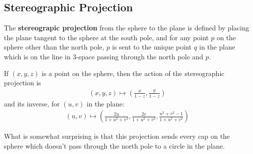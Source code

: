 \subsection{Stereographic Projection}


\begin{definition}
  The \textbf{stereograpic projection} from the sphere to the plane is
  defined by placing the plane tangent to the sphere at the south
  pole, and for any point $p$ on the sphere other than the north pole,
  $p$ is sent to the unique point $q$ in the plane which is on the
  line in 3-space passing through the north pole and $p$.

  If $(x,y,z)$ is a point on the sphere, then the action of the
  stereographic projection is
  \begin{align*}
    (x,y,z)\mapsto \left(\frac{x}{1-z},\frac{y}{1-z}\right)
  \end{align*}
  and its inverse, for $(u,v)$ in the plane:
  \begin{align*}
    (u,v)\mapsto \left( \frac{2u}{1+u^2+v^2},\frac{2v}{1+u^2+v^2},
    \frac{u^2+v^2-1}{1+u^2+v^2}   \right)
  \end{align*}
\end{definition}

What is somewhat surprising is that this projection sends every cap on
the sphere which doesn't pass through the north pole to a circle in
the plane. 


